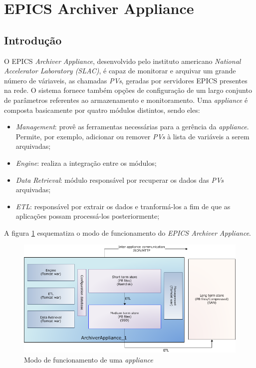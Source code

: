 \section {EPICS Archiver Appliance}
\label{sec:archiver}
\subsection {Introdução}

O EPICS \textit{Archiver Appliance}, desenvolvido pelo instituto americano
\textit{National Accelerator Laboratory (SLAC)}, é capaz de monitorar e arquivar
um grande número de váriaveis, as chamadas \textit{PVs}, geradas por servidores
EPICS presentes na rede. O sistema fornece também opções de configuração de um
largo conjunto de parâmetros referentes ao armazenamento e monitoramento. Uma
\textit{appliance} é composta basicamente por quatro módulos distintos, sendo eles:

\begin{itemize}
  \renewcommand\labelitemi{--}
  \item \textit{Management}: provê as ferramentas necessárias para a gerência
  da \textit{appliance}. Permite, por exemplo, adicionar ou remover \textit{PVs}
  à lista de variáveis a serem arquivadas;
  \item \textit{Engine}: realiza a integração entre os módulos;
  \item \textit{Data Retrieval}: módulo responsável por recuperar os dados das
  \textit{PVs} arquivadas;
  \item \textit{ETL}: responsável por extrair os dados e tranformá-los a fim de
  que as aplicações possam processá-los posteriormente;
\end{itemize}

A figura \ref{fig:epics_archiver} esquematiza o modo de funcionamento do
\textit{EPICS Archiver Appliance}.

\FloatBarrier

\begin{figure}[h]
    
    \centering
    \includegraphics[scale=0.6]{image/applarch}
    \caption {Modo de funcionamento de uma \textit{appliance}}
    \label{fig:epics_archiver} 
\end{figure} 

